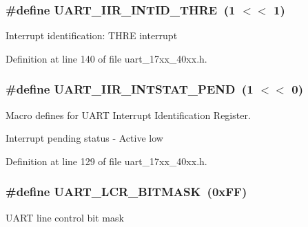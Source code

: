 \subsubsection[{\texorpdfstring{U\+A\+R\+T\+\_\+\+I\+I\+R\+\_\+\+I\+N\+T\+I\+D\+\_\+\+T\+H\+RE}{UART_IIR_INTID_THRE}}]{\setlength{\rightskip}{0pt plus 5cm}\#define U\+A\+R\+T\+\_\+\+I\+I\+R\+\_\+\+I\+N\+T\+I\+D\+\_\+\+T\+H\+RE~(1 $<$$<$ 1)}\hypertarget{group__UART__17XX__40XX_gafb93160677afbc9c90f7a0baa917a435}{}\label{group__UART__17XX__40XX_gafb93160677afbc9c90f7a0baa917a435}
Interrupt identification\+: T\+H\+RE interrupt 

Definition at line 140 of file uart\+\_\+17xx\+\_\+40xx.\+h.

\subsubsection[{\texorpdfstring{U\+A\+R\+T\+\_\+\+I\+I\+R\+\_\+\+I\+N\+T\+S\+T\+A\+T\+\_\+\+P\+E\+ND}{UART_IIR_INTSTAT_PEND}}]{\setlength{\rightskip}{0pt plus 5cm}\#define U\+A\+R\+T\+\_\+\+I\+I\+R\+\_\+\+I\+N\+T\+S\+T\+A\+T\+\_\+\+P\+E\+ND~(1 $<$$<$ 0)}\hypertarget{group__UART__17XX__40XX_gab5fadcd32fca709aece83c05f8be1901}{}\label{group__UART__17XX__40XX_gab5fadcd32fca709aece83c05f8be1901}


Macro defines for U\+A\+RT Interrupt Identification Register. 

Interrupt pending status -\/ Active low 

Definition at line 129 of file uart\+\_\+17xx\+\_\+40xx.\+h.

\subsubsection[{\texorpdfstring{U\+A\+R\+T\+\_\+\+L\+C\+R\+\_\+\+B\+I\+T\+M\+A\+SK}{UART_LCR_BITMASK}}]{\setlength{\rightskip}{0pt plus 5cm}\#define U\+A\+R\+T\+\_\+\+L\+C\+R\+\_\+\+B\+I\+T\+M\+A\+SK~(0x\+F\+F)}\hypertarget{group__UART__17XX__40XX_ga28e31fe85eeeb124ff6a471978155356}{}\label{group__UART__17XX__40XX_ga28e31fe85eeeb124ff6a471978155356}
U\+A\+RT line control bit mask 

